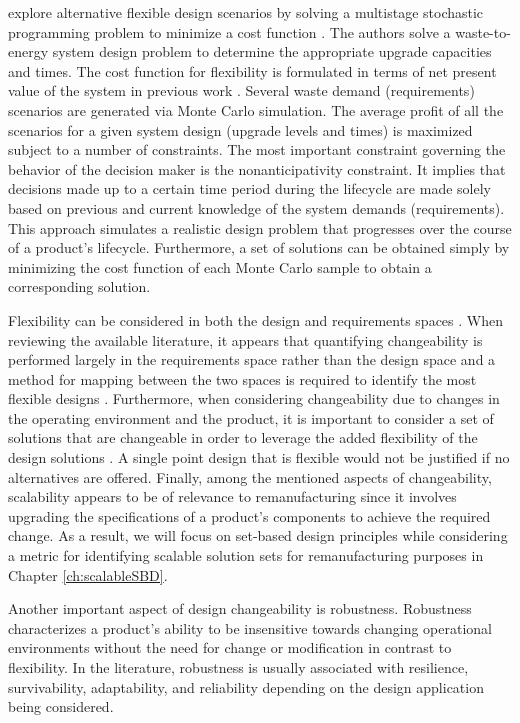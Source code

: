 \citeauthor{Cardin2017} explore alternative flexible design scenarios by solving a multistage stochastic programming problem to minimize a cost function \cite{Cardin2017}. The authors solve a waste-to-energy system design problem to determine the appropriate upgrade capacities and times. The cost function for flexibility is formulated in terms of net present value of the system in previous work \cite{Cardin2016}. Several waste demand (requirements) scenarios are generated via Monte Carlo simulation. The average profit of all the scenarios for a given system design (upgrade levels and  times) is maximized subject to a number of constraints. The most important constraint governing the behavior of the decision maker is the nonanticipativity constraint. It implies that decisions made up to a certain time period during the lifecycle are made solely based on previous and current knowledge of the system demands (requirements). This approach simulates a realistic design problem that progresses over the course of a product's lifecycle. Furthermore, a set of solutions can be obtained simply by minimizing the cost function of each Monte Carlo sample to obtain a corresponding solution.

Flexibility can be considered in both the design and requirements spaces \cite{Ferguson2008}. When reviewing the available literature, it appears that quantifying changeability is performed largely in the requirements space rather than the design space and a method for mapping between the two spaces is required to identify the most flexible designs \cite{Tackett2014,Olewnik2004,Liu2008,Yannou2003}. Furthermore, when considering changeability due to changes in the operating environment and the product, it is important to consider a set of solutions that are changeable in order to leverage the added flexibility of the design solutions \cite{Olewnik2004,Liu2008,Suh2007}. A single point design that is flexible would not be justified if no alternatives are offered. Finally, among the mentioned aspects of changeability, scalability appears to be of relevance to remanufacturing since it involves upgrading the specifications of a product's components to achieve the required change. As a result, we will focus on set-based design principles while considering a metric for identifying scalable solution sets for remanufacturing purposes in Chapter \ref{ch:scalableSBD}.

Another important aspect of design changeability is robustness. Robustness characterizes a product's ability to be insensitive towards changing operational environments without the need for change or modification in contrast to flexibility. In the literature, robustness is usually associated with resilience, survivability, adaptability, and reliability depending on the design application being considered. 

